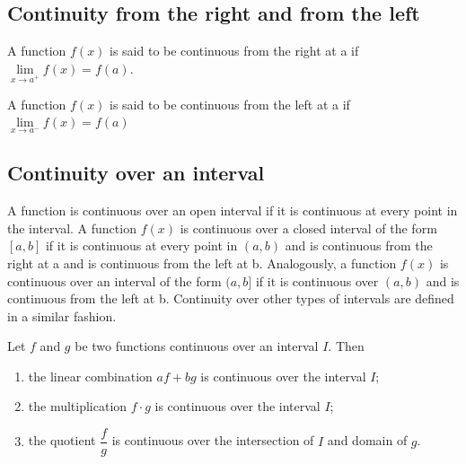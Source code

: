 \hypertarget{continuity-from-the-right-and-from-the-left}{%
\subsection{Continuity from the right and from the
left}\label{continuity-from-the-right-and-from-the-left}}

\begin{definition}

  A function \(f(x)\) is said to be continuous from the right at a if
  \(\lim\limits_{x\to a^+}f(x)=f(a)\).
  
  A function \(f(x)\) is said to be continuous from the left at a if
  \(\lim\limits_{x\to a^-}f(x)=f(a)\)

\end{definition}

\hypertarget{continuity-over-an-interval}{%
\subsection{Continuity over an
interval}\label{continuity-over-an-interval}}

\begin{definition}

A function is continuous over an open interval if it is continuous at
every point in the interval. A function \(f(x)\) is continuous over a
closed interval of the form \([a,b]\) if it is continuous at every point
in \((a,b)\) and is continuous from the right at a and is continuous
from the left at b. Analogously, a function \(f(x)\) is continuous over
an interval of the form \((a,b]\) if it is continuous over \((a,b)\) and
is continuous from the left at b. Continuity over other types of
intervals are defined in a similar fashion.

\end{definition}

\begin{theorem}

  Let \(f\) and \(g\) be two
functions continuous over an interval \(I\). Then

\begin{enumerate}[sepno]
\item
  the linear combination \(af+bg\) is continuous over the interval
  \(I\);
\item
  the multiplication \(f\cdot g\) is continuous over the interval \(I\);
\item
  the quotient \(\dfrac{f}{g}\) is continuous over the intersection of
  \(I\) and domain of \(g\).
\end{enumerate}
\end{theorem}

